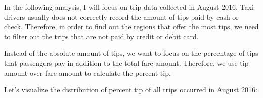 \documentclass[12pt,twoside]{reedthesis}
\newenvironment{Shaded}{\begin{snugshade}}{\end{snugshade}}
\newcommand{\KeywordTok}[1]{\textcolor[rgb]{0.13,0.29,0.53}{\textbf{#1}}}
\newcommand{\DataTypeTok}[1]{\textcolor[rgb]{0.13,0.29,0.53}{#1}}
\newcommand{\DecValTok}[1]{\textcolor[rgb]{0.00,0.00,0.81}{#1}}
\newcommand{\FloatTok}[1]{\textcolor[rgb]{0.00,0.00,0.81}{#1}}
\newcommand{\StringTok}[1]{\textcolor[rgb]{0.31,0.60,0.02}{#1}}
\newcommand{\OperatorTok}[1]{\textcolor[rgb]{0.81,0.36,0.00}{\textbf{#1}}}
\newcommand{\NormalTok}[1]{#1}
\theoremstyle{definition}
\theoremstyle{definition}
\theoremstyle{definition}
\theoremstyle{remark}
\begin{document}
In the following analysis, I will focus on trip data collected in August
2016. Taxi drivers usually does not correctly record the amount of tips
paid by cash or check. Therefore, in order to find out the regions that
offer the most tips, we need to filter out the trips that are not paid
by credit or debit card.
\begin{Shaded}
\end{Shaded}
Instead of the absolute amount of tips, we want to focus on the
percentage of tips that passengers pay in addition to the total fare
amount. Therefore, we use tip amount over fare amount to calculate the
percent tip.
\begin{Shaded}
\end{Shaded}
Let's visualize the distribution of percent tip of all trips occurred in
August 2016:
\end{document}
